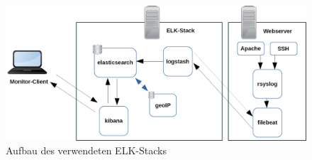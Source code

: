 \begin{figure}[htbp]
    \caption{Aufbau des verwendeten ELK-Stacks}
    \label{app:demo-elk}\vspace{0.2cm}
    \centering
    \includegraphics[scale=0.33]{img/demo-elk}  
\end{figure}